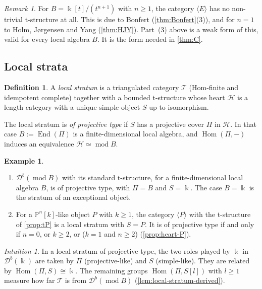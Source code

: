\documentclass[11pt,reqno]{amsart}
\theoremstyle{plain}
\theoremstyle{definition}
\newtheorem{definition}[theorem]{Definition}
\newtheorem{example}[theorem]{Example}
\theoremstyle{remark}
\newtheorem{remark}[theorem]{Remark}
\newtheorem*{intuition}{Intuition}
\newcommand{\kk}{\Bbbk}
\DeclareMathOperator{\Hom}{Hom}
\DeclareMathOperator{\End}{End}
\newcommand{\modd}{\operatorname{mod}}
\newcommand{\Db}{\mathcal{D}^b}
\newcommand{\thick}[1]{\langle #1\rangle}
\newcommand{\Pn}[2]{\mathbb{P}^{#1}[#2]}
\newcommand{\cH}{\mathcal{H}}
\newcommand{\cT}{\mathcal{T}}
\begin{document}
\begin{remark}\label{rem:local-exc-no-t}
For $B=\kk[t]/(t^{n+1})$ with $n\ge1$, the category $\thick E$ has no non-trivial t-structure at all. This is due to Bonfert \cite[Cor.~3.10]{Bonf26} (\cref{thm:Bonfert}(3)), and for $n=1$ to Holm, J\o rgensen and Yang (\cref{thm:HJY}). Part~(3) above is a weak form of this, valid for every local algebra $B$. It is the form needed in \cref{thm:C}.
\end{remark}

\subsection{Local strata}

\begin{definition}\label{def:local-stratum}
A \emph{local stratum} is a triangulated category $\cT$ (Hom-finite and idempotent complete) together with a bounded t-structure whose heart $\cH$ is a length category with a unique simple object $S$ up to isomorphism.

The local stratum is \emph{of projective type} if $S$ has a projective cover $\Pi$ in $\cH$. In that case $B:=\End(\Pi)$ is a finite-dimensional local algebra, and $\Hom(\Pi,-)$ induces an equivalence $\cH\simeq\modd B$.
\end{definition}

\begin{example}\label{ex:local-strata}
\leavevmode
\begin{enumerate}
\item $\Db(\modd B)$ with its standard t-structure, for a finite-dimensional local algebra $B$, is of projective type, with $\Pi=B$ and $S=\kk$. The case $B=\kk$ is the stratum of an exceptional object.
\item For a $\Pn nk$-like object $P$ with $k\ge1$, the category $\thick P$ with the t-structure of \cref{prop:tP} is a local stratum with $S=P$. It is of projective type if and only if $n=0$, or $k\ge2$, or ($k=1$ and $n\ge2$) (\cref{prop:heart-P}).
\end{enumerate}
\end{example}

\begin{intuition}
In a local stratum of projective type, the two roles played by $\kk$ in $\Db(\kk)$ are taken by $\Pi$ (projective-like) and $S$ (simple-like). They are related by $\Hom(\Pi,S)\cong\kk$. The remaining groups $\Hom(\Pi,S[l])$ with $l\ge1$ measure how far $\cT$ is from $\Db(\modd B)$ (\cref{lem:local-stratum-derived}).
\end{intuition}
\end{document}
